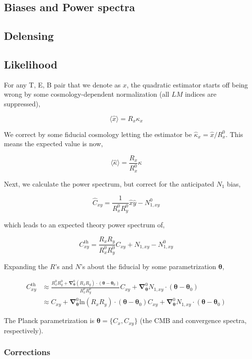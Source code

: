 \documentclass[a4paper, 11pt]{article}
\begin{document}
\subsection{Biases and Power spectra}
\subsection{Delensing}
\subsection{Likelihood}

For any T, E, B pair that we denote as $x$, the quadratic estimator starts off being wrong by some cosmology-dependent normalization (all $LM$ indices are suppressed),

$$
\langle \hat{x} \rangle = R_{x} \kappa_x 
$$

We correct by some fiducial cosmology letting the estimator be $\hat{\kappa}_x = \hat{x} / R^0_x$. This means the expected value is now,

$$
\langle\hat\kappa\rangle = \frac{R_x}{R^0_x}\kappa 
$$

Next, we calculate the power spectrum, but correct for the anticipated $N_1$ bias,

$$
\hat{C}_{xy}=\frac{1}{R^0_xR^0_y}\hat{x}\hat{y} - N_{1,xy}^0
$$

which leads to an expected theory power spectrum of,

$$
C_{xy}^{\mathrm{th}}=\frac{R_xR_y}{R^0_xR^0_y}C_{xy} + N_{1,xy} - N_{1,xy}^0
$$

Expanding the $R$'s and $N$'s about the fiducial by some parametrization $\boldsymbol{\theta}$,

\newcommand{\bth}{\boldsymbol{\theta}}
\newcommand{\bna}{\boldsymbol{\nabla}}

\begin{align*}
C_{xy}^{\mathrm{th}}&\approx\frac{R^0_xR^0_y+\bna^0_{\bth} (R_xR_y)\cdot (\bth-\bth_0)}{R^0_xR^0_y}C_{xy} + \bna^0_{\bth} N_{1,xy}\cdot (\bth-\bth_0) \\
&\approx C_{xy}+\bna^0_{\bth} \mathrm{ln}(R_xR_y)\cdot (\bth-\bth_0)C_{xy} + \bna^0_{\bth} N_{1,xy}\cdot (\bth-\bth_0)
\end{align*}

The Planck parametrization is $\bth=\{C_x, C_{xy}\}$ (the CMB and convergence spectra, respectively).

\subsubsection{Corrections}
\end{document}
